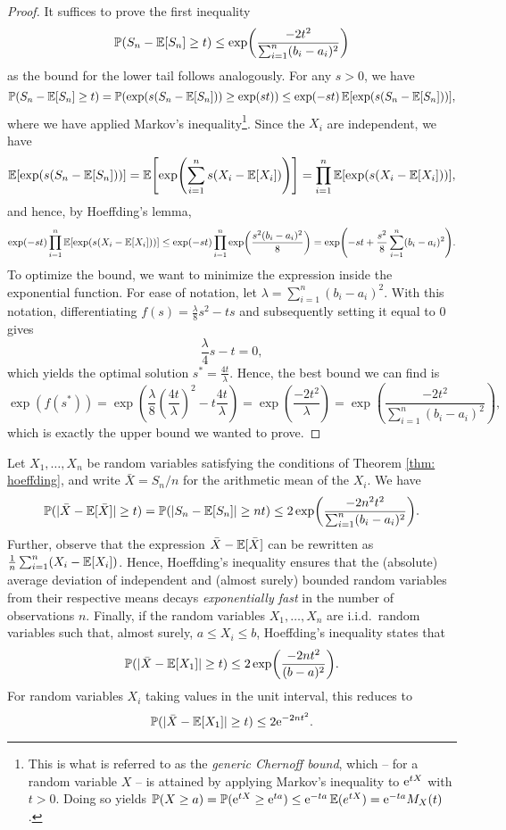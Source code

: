 \begin{proof}
It suffices to prove the first inequality
\[
    \mathbb{P}(S_n - \operatorname{\mathbb{E}}[S_n] \geq t) \leq \exp(\frac{-2t^2}{\sum_{i=1}^n (b_i - a_i)^2})
\]
as the bound for the lower tail follows analogously. For any $s>0$, we have
\[
    \mathbb{P}(S_n - \operatorname{\mathbb{E}}[S_n] \geq t) = \mathbb{P}(\exp(s(S_n - \operatorname{\mathbb{E}}[S_n])) \geq \exp(st)) \leq \exp(-st) \operatorname{\mathbb{E}}[\exp(s(S_n - \operatorname{\mathbb{E}}[S_n]))],
\]
where we have applied Markov's inequality\footnote{This is what is referred to as the \emph{generic Chernoff bound}, which -- for a random variable $X$ -- is attained by applying Markov's inequality to $\mathrm{e}^{tX}$ with $t > 0$. Doing so yields $\mathbb{P}(X \geq a) = \mathbb{P}(\mathrm{e}^{tX} \geq \mathrm{e}^{ta}) \leq \mathrm{e}^{-ta} \operatorname{\mathbb{E}}(e^{tX}) = \mathrm{e}^{-ta} M_X(t)$.}. Since the $X_i$ are independent, we have
\[
    \Exp[\exp(s(S_n - \Exp[S_n]))] = \Exp\left[\exp(\sum_{i=1}^n s(X_i - \Exp[X_i]))\right] = \prod_{i=1}^n \Exp[\exp(s(X_i - \Exp[X_i]))],
\]
and hence, by Hoeffding's lemma,
\[
    \exp(-st) \prod_{i=1}^n \operatorname{\mathbb{E}}[\exp(s(X_i - \operatorname{\mathbb{E}}[X_i]))] \leq \exp(-st) \prod_{i=1}^n \exp(\frac{s^2 (b_i - a_i)^2}{8}) = \exp(-st + \frac{s^2}{8} \sum_{i=1}^n (b_i - a_i)^2).
\]
To optimize the bound, we want to minimize the expression inside the exponential function. For ease of notation, let $\lambda = \sum_{i=1}^n (b_i - a_i)^2$. With this notation, differentiating $f(s) = \frac{\lambda}{8} s^2 - ts$ and subsequently setting it equal to $0$ gives
\[
    \frac{\lambda}{4} s - t = 0,
\]
which yields the optimal solution $s^* = \frac{4t}{\lambda}$. Hence, the best bound we can find is
\[
    \exp(f(s^*)) = \exp(\frac{\lambda}{8} \left(\frac{4t}{\lambda}\right)^2 - t \frac{4t}{\lambda}) = \exp(\frac{-2t^2}{\lambda}) = \exp(\frac{-2t^2}{\sum_{i=1}^n (b_i - a_i)^2}),
\]
which is exactly the upper bound we wanted to prove.
\end{proof}

\begin{remark}
Let $X_1, \dots, X_n$ be random variables satisfying the conditions of Theorem \ref{thm: hoeffding}, and write $\bar{X} = S_n/n$ for the arithmetic mean of the $X_i$. We have
\[
    \P(\abs*{\bar{X} - \Exp[\bar{X}]} \geq t) = \P(\abs{S_n - \Exp[S_n]} \geq nt) \leq 2 \exp(\frac{-2 n^2 t^2}{\sum_{i=1}^n (b_i - a_i)^2}).
\]
Further, observe that the expression $\bar{X} - \operatorname{\mathbb{E}}[\bar{X}]$ can be rewritten as $\frac{1}{n} \sum_{i=1}^n (X_i - \operatorname{\mathbb{E}}[X_i])$. Hence, Hoeffding's inequality ensures that the (absolute) average deviation of independent and (almost surely) bounded random variables from their respective means decays \emph{exponentially fast} in the number of observations $n$. Finally, if the random variables $X_1, \dots, X_n$ are i.i.d.\ random variables such that, almost surely, $a \leq X_i \leq b$, Hoeffding's inequality states that
\[
    \P(\abs*{\bar{X} - \Exp[X_1]} \geq t) \leq 2 \exp(\frac{-2nt^2}{(b - a)^2}).
\]
For random variables $X_i$ taking values in the unit interval, this reduces to
\[
    \P(\abs*{\bar{X} - \Exp[X_1]} \geq t) \leq 2 \e^{-2nt^2}.
\]
\end{remark}
